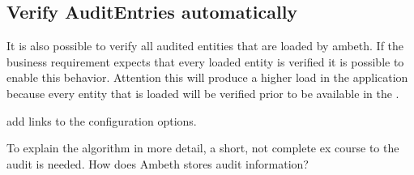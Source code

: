 \subsection{Verify AuditEntries automatically}
It is also possible to verify all audited entities that are loaded by ambeth. If the business requirement expects that every loaded entity is verified it is possible to enable this behavior. Attention this will produce a higher load in the application because every entity that is loaded will be verified prior to be available in the . 

\TODO add links to the configuration options.
 
To explain the algorithm in more detail, a short, not complete ex course to the audit is needed.
How does Ambeth stores audit information?
\pagebreak
\def\showimgref{img/audit-verify.png}

